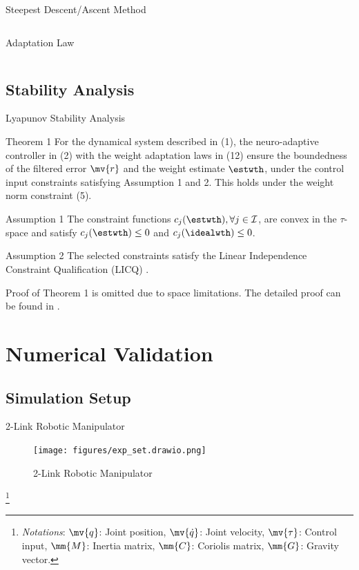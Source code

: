 \documentclass[8pt, aspectratio=169]{beamer}
\begin{document}
\begin{frame}{\insertsubsectionhead}{Steepest Descent/Ascent Method}
\begin{columns}
\begin{block}{Adaptation Law}
        \end{block}

  \end{columns}

\end{frame}

\subsection{Stability Analysis}

\begin{frame}{\insertsubsectionhead}{Lyapunov Stability Analysis}

  \begin{block}{Theorem 1}
    For the dynamical system described in (1), the neuro-adaptive controller in (2) with the weight adaptation laws in (12) ensure the boundedness of the filtered error $\mv{r}$ and the weight estimate $\estwth$, under the control input constraints satisfying Assumption 1 and 2. This holds under the weight norm constraint (5).
  \end{block}

  \begin{exampleblock}{Assumption 1}
    The constraint functions $c_j(\estwth),\forall j\in\mathcal{I}$, are convex in the $\tau$-space and satisfy $c_j(\estwth)\le0$ and $c_j(\idealwth)\le0$.
  \end{exampleblock}

  \begin{exampleblock}{Assumption 2}
    The selected constraints satisfy the Linear Independence Constraint Qualification (LICQ) \cite[Chap. 12 Def. 12.1]{Nocedal:2006aa}.
  \end{exampleblock}

  Proof of Theorem 1 is omitted due to space limitations. The detailed proof can be found in \cite{}.

\end{frame}

\section{Numerical Validation}

\subsection{Simulation Setup}
\begin{frame}{\insertsubsectionhead}{2-Link Robotic Manipulator}
    
  \begin{figure}
    \centering
    \texttt{[image: figures/exp\_set.drawio.png]}
    \caption{2-Link Robotic Manipulator}
  \end{figure}

  \let\thefootnote\relax\footnote{
    \textit{Notations}: 
      $\mv{q}$: Joint position, $\mv{\dot{q}}$: Joint velocity, $\mv{\tau}$: Control input, $\mm{M}$: Inertia matrix, $\mm{C}$: Coriolis matrix, $\mm{G}$: Gravity vector.
  }


\end{frame}
\end{document}

